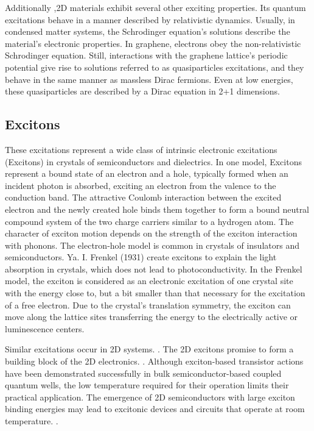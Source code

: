 Additionally \cite{Dirac2}\cite{Dirac3} ,2D materials exhibit several other exciting properties. Its quantum excitations behave in a manner described by relativistic dynamics. Usually, in condensed matter systems, the Schrodinger equation's solutions describe the material's electronic properties. In graphene, electrons obey the non-relativistic Schrodinger equation. Still, interactions with the graphene lattice's periodic potential give rise to solutions referred to as quasiparticles excitations, and they behave in the same manner as massless Dirac fermions. Even at low energies, these quasiparticles are described by a Dirac equation in 2+1 dimensions.\cite{Dirac3}

\subsection{Excitons}
These excitations represent a wide class of intrinsic electronic excitations (Excitons) \cite{Excitons1, Excitons2} in crystals of semiconductors and dielectrics. In one model, Excitons represent a bound state of an electron and a hole, typically formed when an incident photon is absorbed, exciting an electron from the valence to the conduction band. The attractive Coulomb interaction between the excited electron and the newly created hole binds them together to form a bound neutral compound system of the two charge carriers similar to a hydrogen atom. 
The character of exciton motion depends on the strength of the exciton interaction with phonons. The electron-hole model is common in crystals of insulators and semiconductors.
Ya. I. Frenkel (1931) create excitons to explain the light absorption in crystals, which does not lead to photoconductivity. In the Frenkel model, the exciton is considered as an electronic excitation of one crystal site with the energy close to, but a bit smaller than that necessary for the excitation of a free electron. Due to the crystal's translation symmetry, the exciton can move along the lattice sites transferring the energy to the electrically active or luminescence centers.

Similar excitations occur in 2D systems. \cite{Excitons2D1,Excitons2D3}. The 2D excitons promise to form a building block of the 2D electronics. \cite{Excitons2D2}.  Although exciton-based transistor actions have been demonstrated successfully in bulk semiconductor-based coupled quantum wells, the low temperature required for their operation limits their practical application. The emergence of 2D semiconductors with large exciton binding energies may lead to excitonic devices and circuits that operate at room temperature. \cite{Excitons2D2}.

